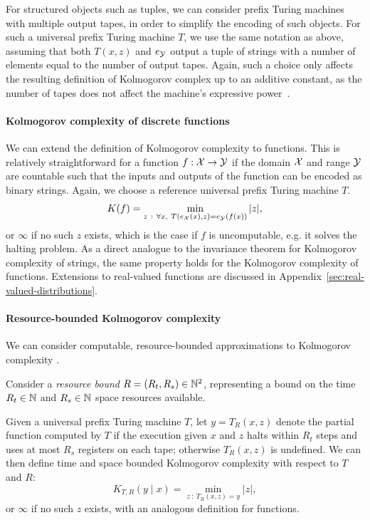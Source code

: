For structured objects such as tuples, we can consider prefix Turing machines with multiple output tapes, in order to simplify the encoding of such objects. For such a universal prefix Turing machine $T$, we use the same notation as above, assuming that both $T(x,z)$ and $e_{{\mathcal{Y}}}$ output a tuple of strings with a number of elements equal to the number of output tapes. Again, such a choice only affects the resulting definition of Kolmogorov complex up to an additive constant, as the number of tapes does not affect the machine's expressive power~\citep{papadimitriou1994computational}.

\paragraph{Kolmogorov complexity of discrete functions} We can extend the definition of Kolmogorov complexity to functions. This is relatively straightforward for a function $f: {\mathcal{X}} \rightarrow {\mathcal{Y}}$ if the domain ${\mathcal{X}}$ and range ${\mathcal{Y}}$ are countable such that the inputs and outputs of the function can be encoded as binary strings. Again, we choose a reference universal prefix Turing machine $T$.
\begin{equation}
    K(f) = \min_{z ~:~ \forall x,~T(e_{\mathcal{X}}(x),z) = e_{\mathcal{Y}}(f(x))} |z|,
\label{eq:kolmogorov-discrete-function}
\end{equation}
or $\infty$ if no such $z$ exists, which is the case if $f$ is uncomputable, e.g. it solves the halting problem. 
As a direct analogue to the invariance theorem for Kolmogorov complexity of strings, the same property holds for the Kolmogorov complexity of functions. 
Extensions to real-valued functions are discussed in Appendix~\ref{sec:real-valued-distributions}. 

\paragraph{Resource-bounded Kolmogorov complexity} We can consider computable, resource-bounded approximations to Kolmogorov complexity \citep[section 7]{li2008introduction}. 

Consider a \emph{resource bound} $R = (R_t, R_s) \in {\mathbb{N}^2}$, representing a bound on the time $R_t \in \mathbb{N}$ and $R_s \in \mathbb{N}$ space resources available.

Given a universal prefix Turing machine $T$, let $y = T_R(x,z)$ denote the partial function computed by $T$ if the execution given $x$ and $z$ halts within $R_t$ steps and uses at most $R_s$ registers on each tape; otherwise $T_R(x,z)$ is undefined. We can then define time and space bounded Kolmogorov complexity with respect to $T$ and $R$:
\begin{equation}
    K_{T,R}(y \mid x) = \min_{z ~:~ T_R(x,z) = y} |z|,
    \label{eq:bounded-kolmogorov}
\end{equation}
or $\infty$ if no such $z$ exists, with an analogous definition for functions.

